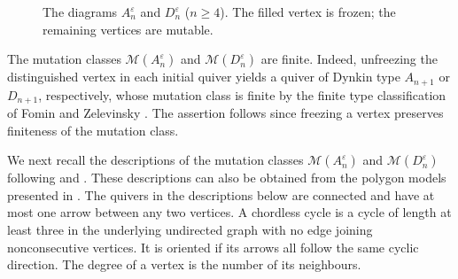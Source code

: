 \documentclass[a4paper, 12pt, reqno]{amsart}
\theoremstyle{definition}
\begin{document}

\begin{figure}[htbp]
\centering
{}
\caption{The diagrams $A_n^\varepsilon$ and $D_n^\varepsilon$ ($n\geq4$). The filled vertex is frozen; the remaining vertices are mutable.} \label{the initial diagrams}
\end{figure}


The mutation classes $\mathcal{M}(A_n^\varepsilon)$ and $\mathcal{M}(D_n^\varepsilon)$ are finite. Indeed, unfreezing the distinguished vertex in each initial quiver yields a quiver of Dynkin type $A_{n+1}$ or $D_{n+1}$, respectively, whose mutation class is finite by the finite type classification of Fomin and Zelevinsky \cite[Theorem 1.4]{FZ2003}. The assertion follows since freezing a vertex preserves finiteness of the mutation class.


We next recall the descriptions of the mutation classes $\mathcal{M}(A_n^\varepsilon)$ and $\mathcal{M}(D_n^\varepsilon)$ following \cite[Section~4.2]{DLL2020} and \cite[Section~2]{Vatne2010}. These descriptions can also be obtained from the polygon models presented in \cite[Chapter~3]{Schiffler2014}. The quivers in the descriptions below are connected and have at most one arrow between any two vertices. A chordless cycle is a cycle of length at least three in the underlying undirected graph with no edge joining nonconsecutive vertices. It is oriented if its arrows all follow the same cyclic direction. The degree of a vertex is the number of its neighbours.
\end{document}

